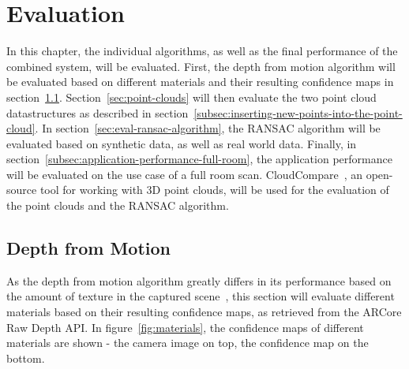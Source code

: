 \chapter{Evaluation}\label{ch:evaluation}
In this chapter, the individual algorithms, as well as the final performance of the combined system, will be evaluated.
First, the depth from motion algorithm will be evaluated based on different materials and their resulting confidence maps in section~\ref{sec:eval-depth-from-motion}.
Section~\ref{sec:point-clouds} will then evaluate the two point cloud datastructures as described in section~\ref{subsec:inserting-new-points-into-the-point-cloud}.
In section~\ref{sec:eval-ransac-algorithm}, the RANSAC algorithm will be evaluated based on synthetic data, as well as real world data.
Finally, in section~\ref{subsec:application-performance-full-room}, the application performance will be evaluated on the use case of a full room scan.
CloudCompare~\cite{daniel_girardeau-montaut_cloudcompare_nodate}, an open-source tool for working with 3D point clouds, will be used for the evaluation of the point clouds and the RANSAC algorithm.

\section{Depth from Motion}\label{sec:eval-depth-from-motion}
As the depth from motion algorithm greatly differs in its performance based on the amount of texture in the captured scene~\cite{google_llc_arcore_doc},
this section will evaluate different materials based on their resulting confidence maps, as retrieved from the ARCore Raw Depth API\@.
In figure~\ref{fig:materials}, the confidence maps of different materials are shown - the camera image on top, the confidence map on the bottom.


